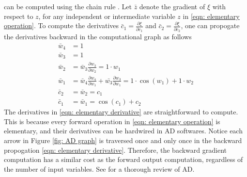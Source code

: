 can be computed using the chain rule \cite{AD review}. 
Let $\bar{z}$ 
denote the gradient of $\xi$ with respect to $z$, for any independent or intermediate
variable $z$ in \eqref{eqn: elementary operation}.
To compute the derivatives $\bar{c}_1 = \frac{\partial \xi}{\partial c_1}$ and
$\bar{c}_2 = \frac{\partial \xi}{\partial c_2}$,
one can propogate the derivatives backward in the computational graph as follows
\begin{equation}\begin{split}
    \bar{w}_4 & = 1\\
    \bar{w}_3& =1\\
    \bar{w}_2 & = \bar{w}_3 \frac{\partial w_3}{\partial w_2} = 1\cdot w_1\\
    \bar{w}_1 & = \bar{w}_4 \frac{\partial w_4}{\partial w_1} + \bar{w_3} 
                  \frac{\partial w_3}{\partial w_1} = 1\cdot \cos(w_1) +1\cdot w_2\\
    \bar{c}_2 &= \bar{w}_2 = c_1\\
    \bar{c}_1 &= \bar{w}_1 = \cos(c_1) + c_2
\end{split}
\label{eqn: elementary derivative}
\end{equation}
The derivatives in \eqref{eqn: elementary derivative} are straightforward to compute.
This is because every forward operation in \eqref{eqn: elementary operation} is elementary, and
their derivatives can be hardwired in AD softwares. 
Notice each arrow in Figure \ref{fig: AD graph} is traversed once and only once in the backward propogation 
\eqref{eqn: elementary derivative}. Therefore, the backward
gradient computation has a similar cost as the forward output computation, regardless of
the number of input variables. 
See \cite{AD review} for a thorough review of AD.\\

